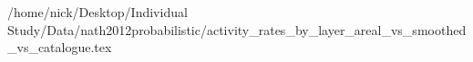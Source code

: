 /home/nick/Desktop/Individual Study/Data/nath2012probabilistic/activity_rates_by_layer_areal_vs_smoothed_vs_catalogue.tex